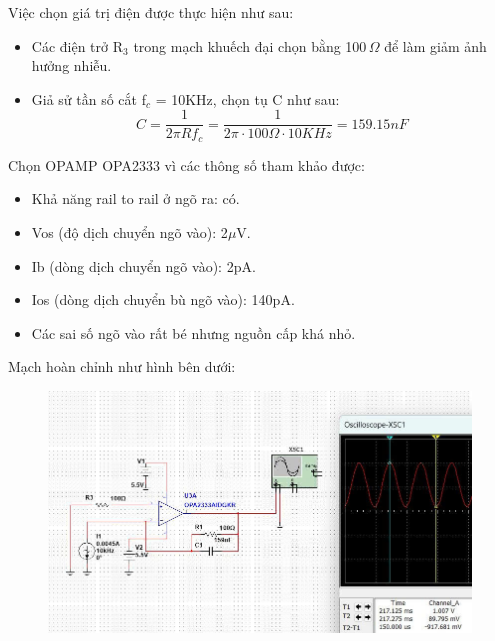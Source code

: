 Việc chọn giá trị điện được thực hiện như sau:
\begin{itemize}
    \item Các điện trở R$_3$ trong mạch khuếch đại chọn bằng 100\,$\Omega$ để làm giảm ảnh hưởng nhiễu.
    \item Giả sử tần số cắt f$_c$ = 10KHz, chọn tụ C như sau:
    \begin{equation*}
        C = \dfrac{1}{2\pi R f_c} = \dfrac{1}{2\pi \cdot 100\Omega \cdot 10KHz} = 159.15n F
    \end{equation*}
\end{itemize}

Chọn OPAMP OPA2333 vì các thông số tham khảo được:
\begin{itemize}
    \item Khả năng rail to rail ở ngõ ra: có.
    \item Vos (độ dịch chuyển ngõ vào): 2$\mu$V.
    \item Ib (dòng dịch chuyển ngõ vào): 2pA.
    \item Ios (dòng dịch chuyển bù ngõ vào): 140pA.
    \item Các sai số ngõ vào rất bé nhưng nguồn cấp khá nhỏ.
\end{itemize}
Mạch hoàn chỉnh như hình bên dưới:
\begin{figure}[H]
    \centering
    \includegraphics[scale=0.5]{image/C7.jpg}
\end{figure}